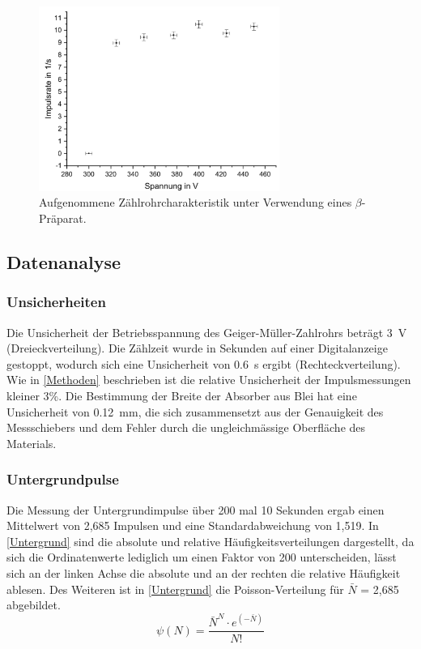 \documentclass[
	a4paper,
	12pt,
	pagesize,
	ngerman
]{scrartcl}
\begin{document}
	
	
	\begin{figure}[H]
		\includegraphics[width=0.7\textwidth]{Zaehlrohrcharakteristik}
		\centering
		\caption{Aufgenommene Zählrohrcharakteristik unter Verwendung eines $\beta$-Präparat.}%
		\label{Zaehlrohrcharakteristik}
		\centering
	\end{figure}
	\subsection{Datenanalyse}
	\subsubsection{Unsicherheiten} %
	Die Unsicherheit der Betriebsspannung des Geiger-Müller-Zahlrohrs beträgt \SI{3}{V} (Dreieckverteilung).  
	Die Zählzeit wurde in Sekunden auf einer Digitalanzeige gestoppt, wodurch sich eine Unsicherheit von \SI{0,6}{s} ergibt (Rechteckverteilung).
	Wie in \cref{Methoden} beschrieben ist die relative Unsicherheit der Impulsmessungen kleiner 3\%.
	Die Bestimmung der Breite der Absorber aus Blei hat eine Unsicherheit von \SI{0,12}{mm}, die sich zusammensetzt aus der Genauigkeit des Messschiebers und dem Fehler durch die ungleichmässige Oberfläche des Materials.
	
	\subsubsection{Untergrundpulse}
	Die Messung der Untergrundimpulse über 200 mal 10 Sekunden ergab einen Mittelwert von 2,685 Impulsen und eine Standardabweichung von 1,519. 
	In \cref{Untergrund} sind die absolute und relative Häufigkeitsverteilungen dargestellt, da sich die Ordinatenwerte lediglich um einen Faktor von 200 unterscheiden, lässt sich an der linken Achse die absolute und an der rechten die relative Häufigkeit ablesen.
	Des Weiteren ist in \cref{Untergrund} die Poisson-Verteilung für $\bar{N}$ = 2,685 abgebildet.
	\begin{equation}
		\psi(N) = \frac{\bar{N}^N \cdot e^{(-\bar{N})}}{N!}
	\label{Poisson}
	\end{equation}
	
\end{document}
